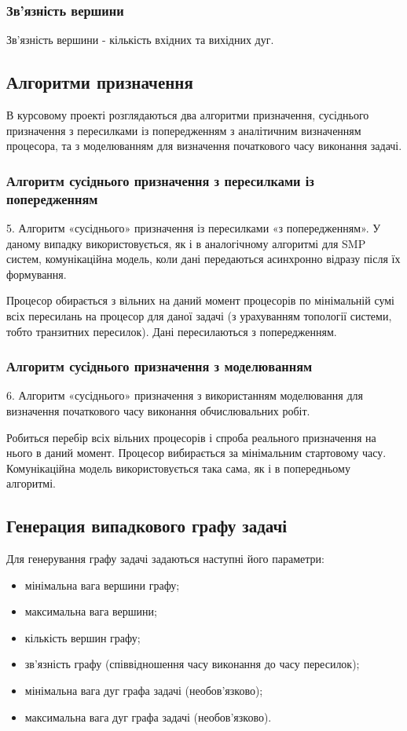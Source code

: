     \subsubsection{Зв'язність вершини}
    Зв'язність вершини - кількість вхідних та вихідних дуг.

\subsection{Алгоритми призначення}
    В курсовому проекті розглядаються два алгоритми призначення, сусіднього призначення з пересилками із попередженням з аналітичним визначенням процесора, та з моделюванням для визначення початкового часу виконання задачі.

    \subsubsection{Алгоритм сусіднього призначення з пересилками із попередженням}
    5. Алгоритм «сусіднього» призначення із пересилками «з попередженням». У даному випадку використовується, як і в аналогічному алгоритмі для SMP систем, комунікаційна модель, коли дані передаються асинхронно відразу після їх формування. 

    Процесор обирається з вільних на даний момент процесорів по мінімальній сумі всіх пересилань на процесор для даної задачі (з урахуванням топології системи, тобто транзитних пересилок). Дані пересилаються з попередженням.

    \subsubsection{Алгоритм сусіднього призначення з моделюванням}
    6. Алгоритм «сусіднього» призначення з використанням моделювання для визначення початкового часу виконання обчислювальних робіт.

    Робиться перебір всіх вільних процесорів і спроба реального призначення на нього в даний момент. Процесор вибирається за мінімальним стартовому часу.
    Комунікаційна модель використовується така сама, як і в попередньому алгоритмі.

\subsection{Генерация випадкового графу задачі}
    Для генерування графу задачі  задаються наступні його параметри:
    \begin{itemize}
    \item мінімальна вага вершини графу;
    \item максимальна вага вершини;
    \item кількість вершин графу;
    \item зв’язність графу  (співвідношення часу виконання до часу пересилок);
    \item мінімальна вага дуг графа задачі (необов’язково);
    \item максимальна вага дуг графа задачі (необов’язково).
    \end{itemize}

